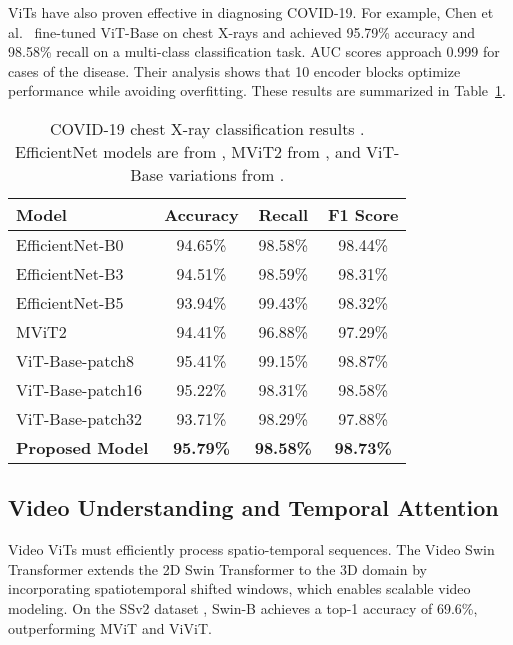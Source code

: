 \documentclass[conference]{IEEEtran}
\begin{document}
ViTs have also proven effective in diagnosing COVID-19. For example, Chen et al.~\cite{chen2024vitcovid} fine-tuned ViT-Base \cite{dosovitskiy2021an} on chest X-rays and achieved 95.79\% accuracy and 98.58\% recall on a multi-class classification task. AUC scores approach 0.999 for cases of the disease. Their analysis shows that 10 encoder blocks optimize performance while avoiding overfitting. These results are summarized in Table~\ref{tab:medical}.

\begin{table}[ht]
\caption{COVID-19 chest X-ray classification results \cite{chen2024vitcovid}. EfficientNet models are from \cite{cai2022efficientvit}, MViT2 from \cite{li2022mvitv2}, and ViT-Base variations from \cite{dosovitskiy2021an}.}
\label{tab:medical}
\centering
\begin{tabular}{lccc}
\toprule
\textbf{Model} & \textbf{Accuracy} & \textbf{Recall} & \textbf{F1 Score} \\
\midrule
EfficientNet-B0         & 94.65\% & 98.58\% & 98.44\% \\
EfficientNet-B3         & 94.51\% & 98.59\% & 98.31\% \\
EfficientNet-B5          & 93.94\% & 99.43\% & 98.32\% \\
MViT2                   & 94.41\% & 96.88\% & 97.29\% \\
ViT-Base-patch8         & 95.41\% & 99.15\% & 98.87\% \\
ViT-Base-patch16        & 95.22\% & 98.31\% & 98.58\% \\
ViT-Base-patch32        & 93.71\% & 98.29\% & 97.88\% \\
\textbf{Proposed Model} & \textbf{95.79\%} & \textbf{98.58\%} & \textbf{98.73\%} \\
\bottomrule
\end{tabular}
\end{table}


\subsection{Video Understanding and Temporal Attention}

Video ViTs must efficiently process spatio-temporal sequences. The Video Swin Transformer \cite{liu2022videoswin} extends the 2D Swin Transformer to the 3D domain by incorporating spatiotemporal shifted windows, which enables scalable video modeling. On the SSv2 dataset \cite{goyal2017something}, Swin-B achieves a top-1 accuracy of 69.6\%, outperforming MViT \cite{fan2021multiscale} and ViViT.
\end{document}

